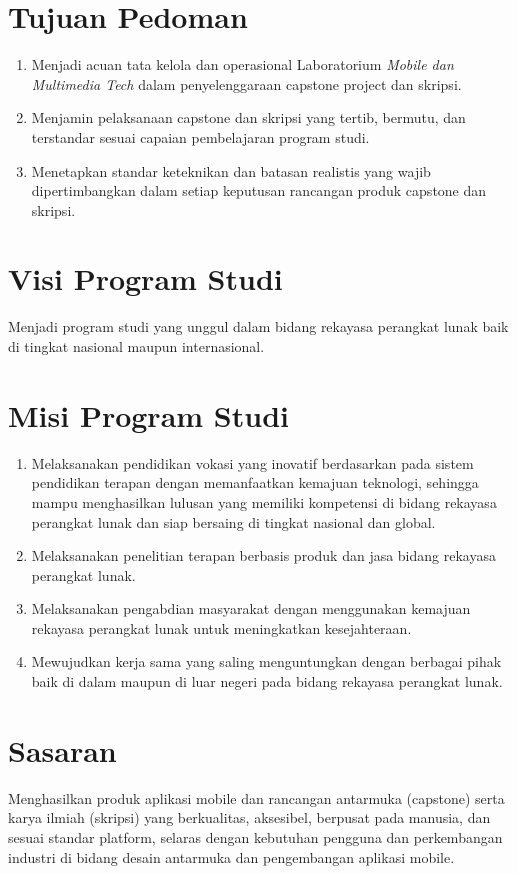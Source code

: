 \documentclass[12pt,a4paper]{report}
\begin{document}
\section{Tujuan Pedoman}
\begin{enumerate}
\item Menjadi acuan tata kelola dan operasional Laboratorium \emph{Mobile dan Multimedia Tech} dalam penyelenggaraan capstone project dan skripsi.
\item Menjamin pelaksanaan capstone dan skripsi yang tertib, bermutu, dan terstandar sesuai capaian pembelajaran program studi.
\item Menetapkan standar keteknikan dan batasan realistis yang wajib dipertimbangkan dalam setiap keputusan rancangan produk capstone dan skripsi.
\end{enumerate}

\section{Visi Program Studi}
Menjadi program studi yang unggul dalam bidang rekayasa perangkat lunak baik di tingkat nasional maupun internasional.

\section{Misi Program Studi}
\begin{enumerate}
\item Melaksanakan pendidikan vokasi yang inovatif berdasarkan pada sistem pendidikan terapan dengan memanfaatkan kemajuan teknologi, sehingga mampu menghasilkan lulusan yang memiliki kompetensi di bidang rekayasa perangkat lunak dan siap bersaing di tingkat nasional dan global.
\item Melaksanakan penelitian terapan berbasis produk dan jasa bidang rekayasa perangkat lunak.
\item Melaksanakan pengabdian masyarakat dengan menggunakan kemajuan rekayasa perangkat lunak untuk meningkatkan kesejahteraan.
\item Mewujudkan kerja sama yang saling menguntungkan dengan berbagai pihak baik di dalam maupun di luar negeri pada bidang rekayasa perangkat lunak.
\end{enumerate}

\section{Sasaran}
Menghasilkan produk aplikasi mobile dan rancangan antarmuka (capstone) serta karya ilmiah (skripsi) yang berkualitas, aksesibel, berpusat pada manusia, dan sesuai standar platform, selaras dengan kebutuhan pengguna dan perkembangan industri di bidang desain antarmuka dan pengembangan aplikasi mobile.
\end{document}
